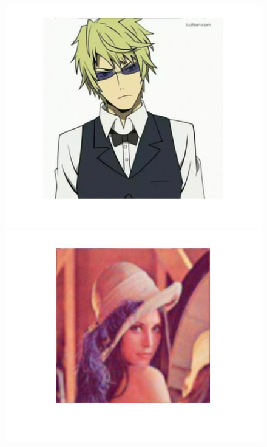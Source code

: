 \documentclass{article}
\theoremstyle{plain} \newtheorem{thm}{Theorem}
\begin{document}
\begin{figure}
\begin{minipage}{.5\linewidth}
	\end{minipage}
	\begin{minipage}{.5\linewidth}
		\includegraphics[width=\linewidth]{shizuwo_recovered_cyclic.jpg}
	\end{minipage}
	\begin{minipage}{.5\linewidth}
		\includegraphics[width=\textwidth]{classic_blurred_cyclic.jpg}
	\end{minipage}
	\begin{minipage}{.5\linewidth}

\end{minipage}
\end{figure}
\end{document}
